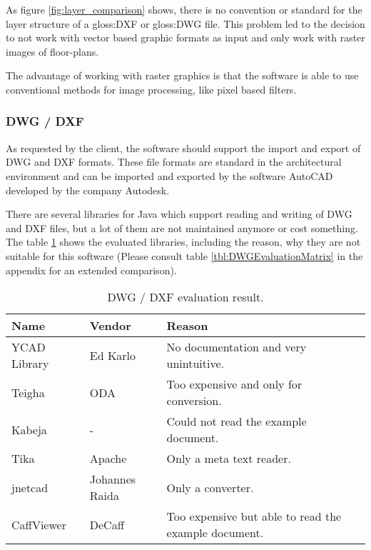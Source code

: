 As figure \ref{fig:layer_comparison} shows, there is no convention or standard for the layer structure of a \gls{gloss:DXF} or \gls{gloss:DWG} file. This problem led to the decision to not work with vector based graphic formats as input and only work with raster images of floor-plans.

The advantage of working with raster graphics is that the software is able to use conventional methods for image processing, like pixel based filters.

\subsubsection{DWG / DXF}
As requested by the client, the software should support the import and export of DWG and DXF formats. These file formats are standard in the architectural environment and can be imported and exported by the software AutoCAD developed by the company Autodesk.

There are several libraries for Java which support reading and writing of DWG and DXF files, but a lot of them are not maintained anymore or cost something. The table \ref{tbl:DWGEvaluationResult} shows the evaluated libraries, including the reason, why they are not suitable for this software (Please consult table \ref{tbl:DWGEvaluationMatrix} in the appendix for an extended comparison).

\begin{table}[h]
\centering
\caption{DWG / DXF evaluation result.}
\label{tbl:DWGEvaluationResult}
\begin{tabular}{@{}lll@{}}
\toprule
Name         & Vendor         & Reason                                               \\ \midrule
YCAD Library & Ed Karlo       & No documentation and very unintuitive.                \\
Teigha       & ODA            & Too expensive and only for conversion.               \\
Kabeja       & -              & Could not read the example document.                 \\
Tika         & Apache         & Only a meta text reader.                             \\
jnetcad      & Johannes Raida & Only a converter.                                    \\
CaffViewer   & DeCaff         & Too expensive but able to read the example document. \\ \bottomrule
\end{tabular}
\end{table}

